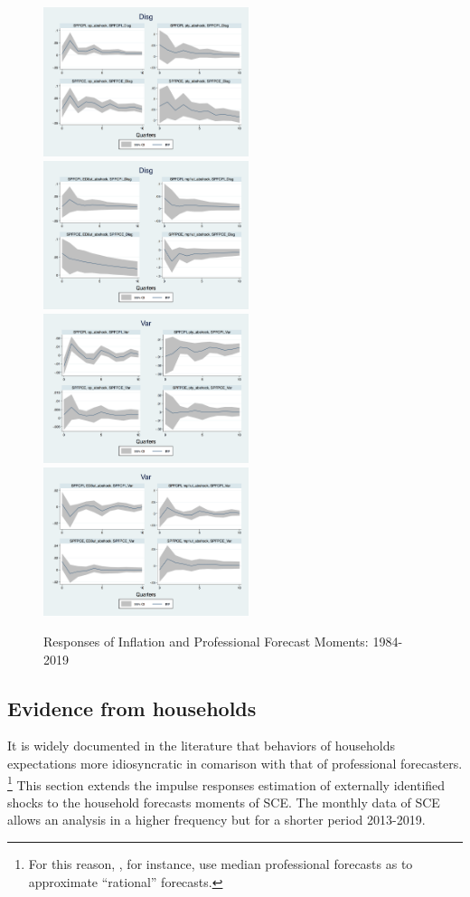 \documentclass[]{article}
\begin{document}
\begin{figure}[ht]
	\smallskip
	\includegraphics[width=6cm]{figures/SPFDisg_ab_ashocks_nmp.png} 
	\includegraphics[width=6cm]{figures/SPFDisg_ab_ashocks.png} \\
	\smallskip 
	\includegraphics[width=6cm]{figures/SPFVar_ab_ashocks_nmp.png} 
	\includegraphics[width=6cm]{figures/SPFVar_ab_ashocks.png} 
	\caption{Responses of Inflation and Professional Forecast Moments: 1984-2019}
	\label{ReplicateCoibionwholeperiod}
\end{figure}


\subsection{Evidence from households}

It is widely documented in the literature that behaviors of households expectations more idiosyncratic in comarison with that of professional forecasters. \footnote{For this reason, \cite{carroll2003macroeconomic}, for instance, use median professional forecasts as to approximate ``rational'' forecasts.} This section extends the impulse responses estimation of externally identified shocks to the household forecasts moments of SCE.  The monthly data of SCE allows an analysis in a higher frequency but for a shorter period 2013-2019. 
\end{document}
